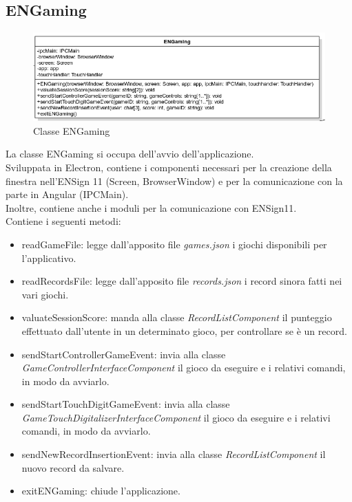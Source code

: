 \subsection{ENGaming}
\begin{figure}[h]
    \centering
    \includegraphics[width=340pt]{ProgettazioneTecnica/ENGamingDettaglio.png}
    \caption{Classe ENGaming}
    \label{fig:engaming}
\end{figure}
La classe ENGaming si occupa dell'avvio dell'applicazione.\\ Sviluppata in Electron, contiene i componenti necessari per la creazione della finestra nell'ENSign 11 (Screen, BrowserWindow) e per la comunicazione con la parte in Angular (IPCMain).\\
Inoltre, contiene anche i moduli per la comunicazione con ENSign11.\\
Contiene i seguenti metodi:
\begin{itemize}
    \item readGameFile: legge dall'apposito file \emph{games.json} i giochi disponibili per l'applicativo. %
    \item readRecordsFile: legge dall'apposito file \emph{records.json} i record sinora fatti nei vari giochi. %
    \item valuateSessionScore: manda alla classe \emph{RecordListComponent} il punteggio effettuato dall'utente in un determinato gioco, per controllare se è un record.
    \item sendStartControllerGameEvent: invia alla classe \emph{GameControllerInterfaceComponent} il gioco da eseguire e i relativi comandi, in modo da avviarlo.
    \item sendStartTouchDigitGameEvent: invia alla classe \emph{GameTouchDigitalizerInterfaceComponent} il gioco da eseguire e i relativi comandi, in modo da avviarlo.
    \item sendNewRecordInsertionEvent: invia alla classe \emph{RecordListComponent} il nuovo record da salvare.
    \item exitENGaming: chiude l'applicazione.
\end{itemize}
\newpage
